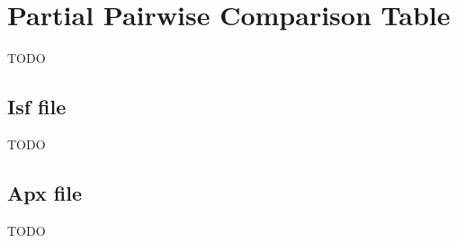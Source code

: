 \section{Partial Pairwise Comparison Table}\label{section:pct}

TODO

\subsection{Isf file}\label{sub:pct-isf}

TODO

\subsection{Apx file}\label{sub:pct-apx}

TODO

\vfill\newpage